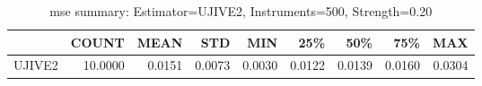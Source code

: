\begin{table}[ht]
\centering
\caption{mse summary: Estimator=UJIVE2, Instruments=500, Strength=0.20}
\begin{tabular}{lrrrrrrrr}
\toprule
 & COUNT & MEAN & STD & MIN & 25\% & 50\% & 75\% & MAX \\
\midrule
UJIVE2 & 10.0000 & 0.0151 & 0.0073 & 0.0030 & 0.0122 & 0.0139 & 0.0160 & 0.0304 \\
\bottomrule
\end{tabular}
\end{table}
